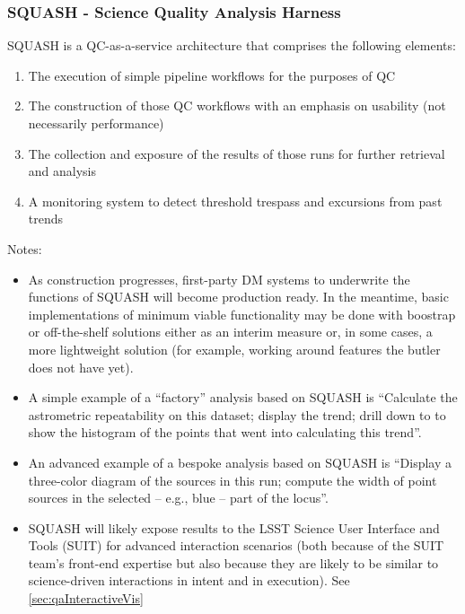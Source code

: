 \documentclass[DM,toc,lsstdraft]{lsstdoc}
\begin{document}
\subsubsection{SQUASH - Science Quality Analysis Harness}
\label{sec:qaSquash}

SQUASH is a QC-as-a-service architecture that comprises the following elements:

\begin{enumerate}

\item The execution of simple pipeline workflows for the purposes of QC

\item The construction of those QC workflows with an emphasis on usability (not necessarily performance)

\item The collection and exposure of the results of those runs for further retrieval and analysis

\item A monitoring system to detect threshold trespass and excursions from past trends

\end{enumerate}

Notes:

\begin{itemize}

\item As construction progresses, first-party DM systems to underwrite the functions of SQUASH will become production ready. In the meantime, basic implementations of minimum viable functionality may be done with boostrap or off-the-shelf solutions either as an interim measure or, in some cases, a more lightweight solution (for example, working around features the butler does not have yet).

\item A simple example of a ``factory'' analysis based on SQUASH is ``Calculate the astrometric repeatability on this dataset; display the trend; drill down to to show the histogram of the points that went into calculating this trend''.

\item An advanced example of a bespoke analysis based on SQUASH is ``Display a three-color diagram of the sources in this run; compute the width of point sources in the selected -- e.g., blue -- part of the locus''.

\item SQUASH will likely expose results to the LSST Science User Interface and Tools (SUIT) for advanced interaction scenarios (both because of the SUIT team's front-end expertise but also because they are likely to be similar to science-driven interactions in intent and in execution). See \ref{sec:qaInteractiveVis}

\end{itemize}
\end{document}
